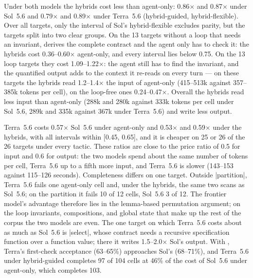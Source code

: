 Under both models the hybrids cost less than agent-only: 0.86$\times$ and 0.87$\times$ under Sol~5.6 and 0.79$\times$ and 0.89$\times$ under Terra~5.6 (hybrid-guided, hybrid-flexible).
Over all targets, only the interval of Sol's hybrid-flexible excludes parity, but the targets split into two clear groups.
On the 13 targets without a loop that needs an invariant, \WP derives the complete contract and the agent only has to check it: the hybrids cost 0.36--0.60$\times$ agent-only, and every interval lies below 0.75.
On the 13 loop targets they cost 1.09--1.22$\times$: the agent still has to find the invariant, and the quantified \WP output adds to the context it re-reads on every turn --- on these targets the hybrids read 1.2--1.4$\times$ the input of agent-only (415--513k against 357--385k tokens per cell), on the loop-free ones 0.24--0.47$\times$.
Overall the hybrids read less input than agent-only (288k and 280k against 333k tokens per cell under Sol~5.6, 289k and 335k against 367k under Terra~5.6) and write less output.

\label{sec:eval-models}

Terra~5.6 costs 0.57$\times$ Sol~5.6 under agent-only and 0.53$\times$ and 0.59$\times$ under the hybrids, with all intervals within [0.45, 0.65], and it is cheaper on 25 or 26 of the 26 targets under every tactic.
These ratios are close to the price ratio of 0.5 for input and 0.6 for output: the two models spend about the same number of tokens per cell, Terra~5.6 up to a fifth more input, and Terra~5.6 is slower (143--153 against 115--126 seconds).
Completeness differs on one target.
Outside |partition|, Terra~5.6 fails one agent-only cell and, under the hybrids, the same two scans as Sol~5.6; on the partition it fails 10 of 12 cells, Sol~5.6 3 of 12.
The frontier model's advantage therefore lies in the lemma-based permutation argument; on the loop invariants, compositions, and global state that make up the rest of the corpus the two models are even.
The one target on which Terra~5.6 costs about as much as Sol~5.6 is |select|, whose contract needs a recursive specification function over a function value; there it writes 1.5--2.0$\times$ Sol's output.
With \WP, Terra's first-check acceptance (63--65\%) approaches Sol's (68--71\%), and Terra~5.6 under hybrid-guided completes 97 of 104 cells at 46\% of the cost of Sol~5.6 under agent-only, which completes 103.

